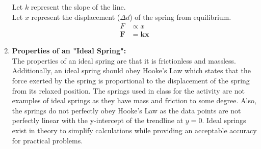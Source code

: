 \documentclass[12pt,letterpaper]{article}
\begin{document}
\begin{enumerate}[font=\bfseries]
	      Let $k$ represent the slope of the line.\\
	      Let $x$ represent the displacement ($\Delta d$) of the spring from equilibrium.
	      \[
		      \begin{aligned}
			      F      & \propto x \\
			      \bm{F} & = \bm{kx}
		      \end{aligned}
	      \]
	\item \textbf{Properties of an "Ideal Spring":}\\
	      The properties of an ideal spring are that it is frictionless and massless.
	      Additionally, an ideal spring should obey Hooke's Law which states that the force exerted by the spring is proportional to the displacement of the spring from its relaxed position.
	      The springs used in class for the activity are not examples of ideal springs as they have mass and friction to some degree.
	      Also, the springs do not perfectly obey Hooke's Law as the data points are not perfectly linear with the y-intercept of the trendline at $y=0$. Ideal springs exist in theory to simplify calculations while providing an acceptable accuracy for practical problems.
\end{enumerate}
\end{document}
